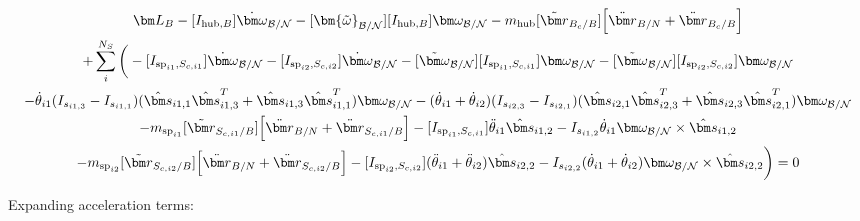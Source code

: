 \begin{multline}
	\bm L_B -[I_{\text{hub},B}] \dot{\bm\omega}_{\cal B/N}  -[\bm{\tilde{\omega}}_{\cal B/N}] [I_{\text{hub},B}] \bm\omega_{\cal B/N} - m_{\text{hub}} [\tilde{{\bm r}}_{B_c/B}] \Big[\ddot{\bm r}_{B/N} + \ddot{\bm r}_{B_c/B}\Big] \\
	+ \sum\limits_{i}^{N_S}\bigg(-[I_{\text{sp}_{i1},S_{c,i1}}] \dot{\bm \omega}_{\cal{B/N}} -[I_{\text{sp}_{i2},S_{c,i2}}] \dot{\bm \omega}_{\cal{B/N}} -[\tilde{\bm \omega}_{\cal{B/N}}] [I_{\text{sp}_{i1},S_{c,i1}}] \bm \omega_{\cal{B/N}}-[\tilde{\bm \omega}_{\cal{B/N}}] [I_{\text{sp}_{i2},S_{c,i2}}] \bm \omega_{\cal{B/N}}\\
	-\dot{\theta}_{i1} (I_{s_{i1,3}} - I_{s_{i1,1}})( \hat{\bm s}_{i1,1} \hat{\bm s}_{i1,3}^T + \hat{\bm s}_{i1,3} \hat{\bm s}_{i1,1}^T) \bm \omega_{\cal{B/N}} -(\dot{\theta}_{i1}  + \dot{\theta}_{i2})(I_{s_{i2,3}} - I_{s_{i2,1}}) (\hat{\bm s}_{i2,1} \hat{\bm s}_{i2,3}^T + \hat{\bm s}_{i2,3} \hat{\bm s}_{i2,1}^T) \bm \omega_{\cal{B/N}} \\
	- m_{\text{sp}_{i1}} [\tilde{{\bm r}}_{S_{c,i1}/B}] \Big[\ddot{\bm r}_{B/N} + \ddot{\bm r}_{S_{c,i1}/B}\Big]
	-[I_{\text{sp}_{i1},S_{c,i1}}] \ddot{\theta}_{i1} \hat{\bm s}_{i1,2}
	-I_{s_{i1,2}} \dot{\theta}_{i1} \bm \omega_{\cal{B/N}} \times \hat{\bm s}_{i1,2}\\
	- m_{\text{sp}_{i2}} [\tilde{{\bm r}}_{S_{c,i2}/B}] \Big[\ddot{\bm r}_{B/N} + \ddot{\bm r}_{S_{c,i2}/B}\Big]
	-[I_{\text{sp}_{i2},S_{c,i2}}] (\ddot{\theta}_{i1}  + \ddot{\theta}_{i2})\hat{\bm s}_{i2,2}
	-I_{s_{i2,2}}  (\dot{\theta}_{i1}  + \dot{\theta}_{i2}) \bm \omega_{\cal{B/N}} \times \hat{\bm s}_{i2,2} \bigg) = 0
\end{multline}

Expanding acceleration terms:

